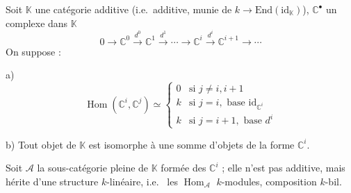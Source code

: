 \documentclass[11pt,a4paper]{article}
\begin{document}

Soit  $\mathbb{K}$ une catégorie additive (i.e.\ additive, munie
de $k \to \mathrm{End}(\mathrm{id}_{\mathbb{K}})$), $\mathbb{C}^{\bullet}$ un complexe  dans
$\mathbb{K}$
\[
0 \to \mathbb{C}^{0} \xrightarrow{d^{0}} \mathbb{C}^{1} \xrightarrow{d^{1}} \cdots \to \mathbb{C}^{i}
\xrightarrow{d^{i}} \mathbb{C}^{i+1} \to \cdots
\]
On suppose :

a)
\[
\operatorname{Hom}(\mathbb{C}^{i}, \mathbb{C}^{j}) \simeq
\begin{cases}
0 & \text{si } j \neq i, i+1 \\
k & \text{si } j = i, \text{ base } \mathrm{id}_{\mathbb{C}^{i}} \\
k & \text{si } j = i+1, \text{ base } d^{i}
\end{cases}
\]

b) Tout objet de $\mathbb{K}$ est isomorphe à une somme  d'objets de la forme $\mathbb{C}^{i}$.

Soit $\mathcal{A}$ la sous-catégorie pleine de $\mathbb{K}$ formée des \struck{\ill{}} $\mathbb{C}^{i}$ ; elle
n'est pas additive, mais hérite d'une structure $k$-linéaire, i.e.\ \struck{\ill{}} les
$\operatorname{Hom}_{\mathcal{A}}$   $k$-modules,  composition
 $k$-bil.
\end{document}
